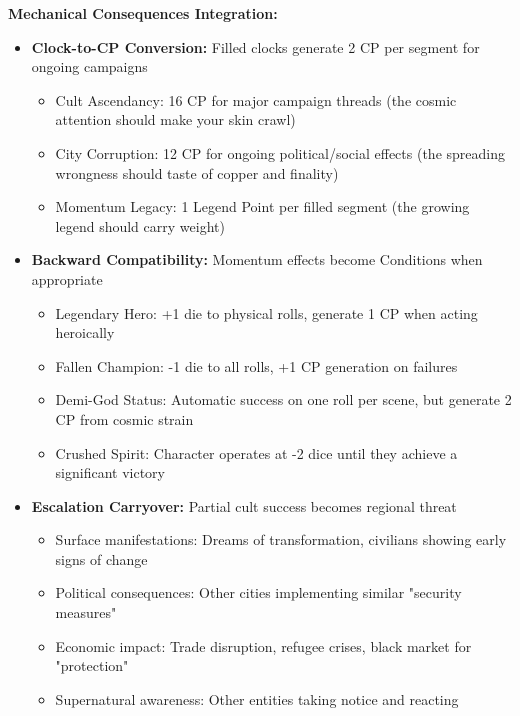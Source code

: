 \documentclass[11pt]{article}
\begin{document}
\begin{itemize}
\textbf{Mechanical Consequences Integration:}
\begin{itemize}
\item \textbf{Clock-to-CP Conversion:} Filled clocks generate 2 CP per segment for ongoing campaigns
  \begin{itemize}
  \item Cult Ascendancy: 16 CP for major campaign threads (the cosmic attention should make your skin crawl)
  \item City Corruption: 12 CP for ongoing political/social effects (the spreading wrongness should taste of copper and finality)
  \item Momentum Legacy: 1 Legend Point per filled segment (the growing legend should carry weight)
  \end{itemize}
\item \textbf{Backward Compatibility:} Momentum effects become Conditions when appropriate
  \begin{itemize}
  \item Legendary Hero: +1 die to physical rolls, generate 1 CP when acting heroically
  \item Fallen Champion: -1 die to all rolls, +1 CP generation on failures
  \item Demi-God Status: Automatic success on one roll per scene, but generate 2 CP from cosmic strain
  \item Crushed Spirit: Character operates at -2 dice until they achieve a significant victory
  \end{itemize}
\item \textbf{Escalation Carryover:} Partial cult success becomes regional threat
  \begin{itemize}
  \item Surface manifestations: Dreams of transformation, civilians showing early signs of change
  \item Political consequences: Other cities implementing similar "security measures"
  \item Economic impact: Trade disruption, refugee crises, black market for "protection"
  \item Supernatural awareness: Other entities taking notice and reacting
  \end{itemize}
\end{itemize}


\end{itemize}
\end{document}

